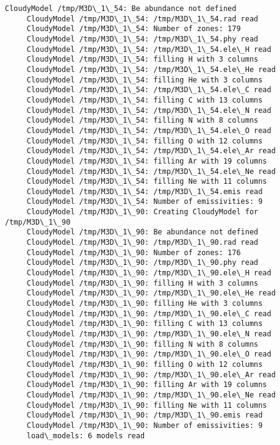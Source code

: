\documentclass[11pt]{article}
\begin{document}
\begin{Verbatim}[commandchars=\\\{\}]
     CloudyModel /tmp/M3D\_1\_54: Be abundance not defined
     CloudyModel /tmp/M3D\_1\_54: /tmp/M3D\_1\_54.rad read
     CloudyModel /tmp/M3D\_1\_54: Number of zones: 179
     CloudyModel /tmp/M3D\_1\_54: /tmp/M3D\_1\_54.phy read
     CloudyModel /tmp/M3D\_1\_54: /tmp/M3D\_1\_54.ele\_H read
     CloudyModel /tmp/M3D\_1\_54: filling H with 3 columns
     CloudyModel /tmp/M3D\_1\_54: /tmp/M3D\_1\_54.ele\_He read
     CloudyModel /tmp/M3D\_1\_54: filling He with 3 columns
     CloudyModel /tmp/M3D\_1\_54: /tmp/M3D\_1\_54.ele\_C read
     CloudyModel /tmp/M3D\_1\_54: filling C with 13 columns
     CloudyModel /tmp/M3D\_1\_54: /tmp/M3D\_1\_54.ele\_N read
     CloudyModel /tmp/M3D\_1\_54: filling N with 8 columns
     CloudyModel /tmp/M3D\_1\_54: /tmp/M3D\_1\_54.ele\_O read
     CloudyModel /tmp/M3D\_1\_54: filling O with 12 columns
     CloudyModel /tmp/M3D\_1\_54: /tmp/M3D\_1\_54.ele\_Ar read
     CloudyModel /tmp/M3D\_1\_54: filling Ar with 19 columns
     CloudyModel /tmp/M3D\_1\_54: /tmp/M3D\_1\_54.ele\_Ne read
     CloudyModel /tmp/M3D\_1\_54: filling Ne with 11 columns
     CloudyModel /tmp/M3D\_1\_54: /tmp/M3D\_1\_54.emis read
     CloudyModel /tmp/M3D\_1\_54: Number of emissivities: 9
     CloudyModel /tmp/M3D\_1\_90: Creating CloudyModel for /tmp/M3D\_1\_90
     CloudyModel /tmp/M3D\_1\_90: Be abundance not defined
     CloudyModel /tmp/M3D\_1\_90: /tmp/M3D\_1\_90.rad read
     CloudyModel /tmp/M3D\_1\_90: Number of zones: 176
     CloudyModel /tmp/M3D\_1\_90: /tmp/M3D\_1\_90.phy read
     CloudyModel /tmp/M3D\_1\_90: /tmp/M3D\_1\_90.ele\_H read
     CloudyModel /tmp/M3D\_1\_90: filling H with 3 columns
     CloudyModel /tmp/M3D\_1\_90: /tmp/M3D\_1\_90.ele\_He read
     CloudyModel /tmp/M3D\_1\_90: filling He with 3 columns
     CloudyModel /tmp/M3D\_1\_90: /tmp/M3D\_1\_90.ele\_C read
     CloudyModel /tmp/M3D\_1\_90: filling C with 13 columns
     CloudyModel /tmp/M3D\_1\_90: /tmp/M3D\_1\_90.ele\_N read
     CloudyModel /tmp/M3D\_1\_90: filling N with 8 columns
     CloudyModel /tmp/M3D\_1\_90: /tmp/M3D\_1\_90.ele\_O read
     CloudyModel /tmp/M3D\_1\_90: filling O with 12 columns
     CloudyModel /tmp/M3D\_1\_90: /tmp/M3D\_1\_90.ele\_Ar read
     CloudyModel /tmp/M3D\_1\_90: filling Ar with 19 columns
     CloudyModel /tmp/M3D\_1\_90: /tmp/M3D\_1\_90.ele\_Ne read
     CloudyModel /tmp/M3D\_1\_90: filling Ne with 11 columns
     CloudyModel /tmp/M3D\_1\_90: /tmp/M3D\_1\_90.emis read
     CloudyModel /tmp/M3D\_1\_90: Number of emissivities: 9
     load\_models: 6 models read

    \end{Verbatim}
\end{document}
